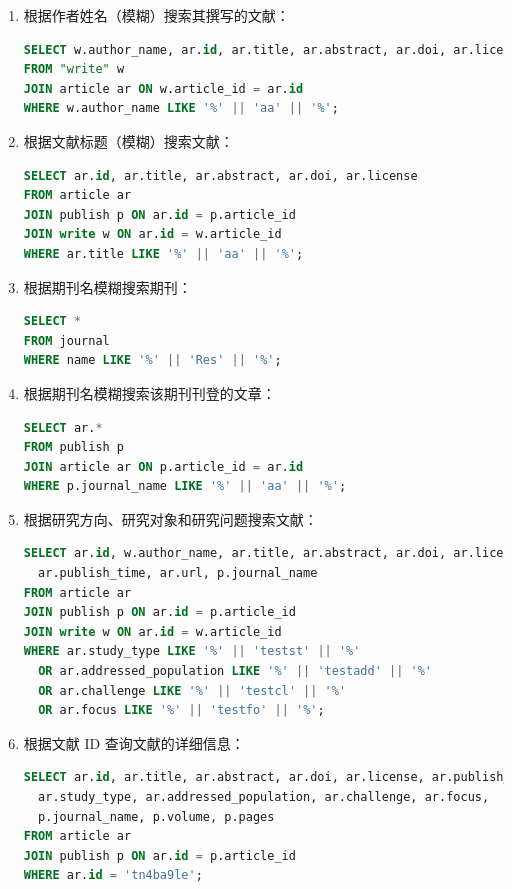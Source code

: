 \documentclass[UTF8,openany]{ctexbook}
\begin{document}
\begin{enumerate}[label=\textbf{\arabic*}]
  \item 根据作者姓名（模糊）搜索其撰写的文献：
  \begin{lstlisting}[language=sql]
SELECT w.author_name, ar.id, ar.title, ar.abstract, ar.doi, ar.license, ar.publish_time, ar.url
FROM "write" w
JOIN article ar ON w.article_id = ar.id
WHERE w.author_name LIKE '%' || 'aa' || '%';
  \end{lstlisting}

  \item 根据文献标题（模糊）搜索文献：
  \begin{lstlisting}[language=sql]
SELECT ar.id, ar.title, ar.abstract, ar.doi, ar.license
FROM article ar
JOIN publish p ON ar.id = p.article_id
JOIN write w ON ar.id = w.article_id
WHERE ar.title LIKE '%' || 'aa' || '%';
  \end{lstlisting}

  \item 根据期刊名模糊搜索期刊：
  \begin{lstlisting}[language=sql]
SELECT *
FROM journal
WHERE name LIKE '%' || 'Res' || '%';
  \end{lstlisting}

  \item 根据期刊名模糊搜索该期刊刊登的文章：
  \begin{lstlisting}[language=sql]
SELECT ar.*
FROM publish p
JOIN article ar ON p.article_id = ar.id
WHERE p.journal_name LIKE '%' || 'aa' || '%';
  \end{lstlisting}

  \item 根据研究方向、研究对象和研究问题搜索文献：
  \begin{lstlisting}[language=sql]
SELECT ar.id, w.author_name, ar.title, ar.abstract, ar.doi, ar.license, 
  ar.publish_time, ar.url, p.journal_name
FROM article ar
JOIN publish p ON ar.id = p.article_id
JOIN write w ON ar.id = w.article_id
WHERE ar.study_type LIKE '%' || 'testst' || '%'
  OR ar.addressed_population LIKE '%' || 'testadd' || '%'
  OR ar.challenge LIKE '%' || 'testcl' || '%'
  OR ar.focus LIKE '%' || 'testfo' || '%';
  \end{lstlisting}

  \item 根据文献 ID 查询文献的详细信息：
  \begin{lstlisting}[language=sql]
SELECT ar.id, ar.title, ar.abstract, ar.doi, ar.license, ar.publish_time, ar.url,
  ar.study_type, ar.addressed_population, ar.challenge, ar.focus,
  p.journal_name, p.volume, p.pages
FROM article ar
JOIN publish p ON ar.id = p.article_id
WHERE ar.id = 'tn4ba9le';
  \end{lstlisting}


\end{enumerate}
\end{document}
